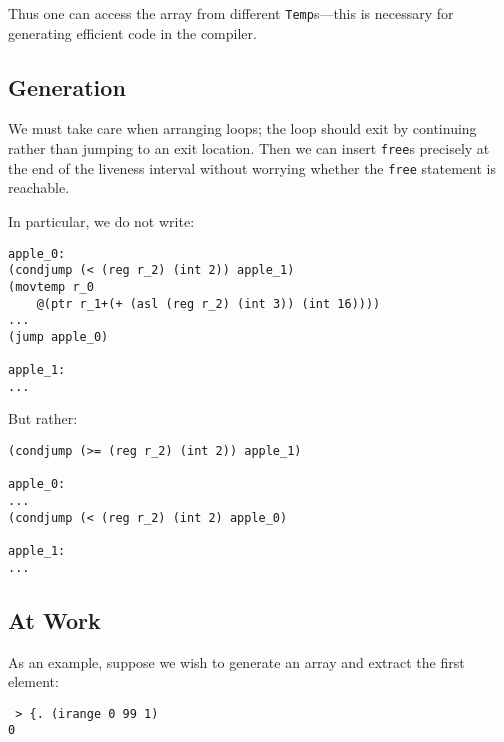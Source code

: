 \documentclass[sigplan,screen]{acmart}
\begin{document}

Thus one can access the array from different {\tt Temp}s---this is necessary for generating efficient code in the compiler.




\subsection{Generation}

We must take care when arranging loops; the loop should exit by continuing rather than jumping to an exit location. Then we can insert {\tt free}s precisely at the end of the liveness interval without worrying whether the {\tt free} statement is reachable.

In particular, we do not write:

\begin{verbatim}
apple_0:
(condjump (< (reg r_2) (int 2)) apple_1)
(movtemp r_0
    @(ptr r_1+(+ (asl (reg r_2) (int 3)) (int 16))))
...
(jump apple_0)

apple_1:
...
\end{verbatim}

But rather:

\begin{verbatim}
(condjump (>= (reg r_2) (int 2)) apple_1)

apple_0:
...
(condjump (< (reg r_2) (int 2) apple_0)

apple_1:
...
\end{verbatim}

\subsection{At Work}

As an example, suppose we wish to generate an array and extract the first element:

\begin{verbatim}
 > {. (irange 0 99 1)
0
\end{verbatim}
\end{document}
